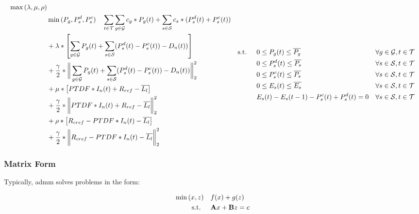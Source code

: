 \begin{subequations}
	\begin{align}
		\max{(\lambda, \mu, \rho)}\\
		 & \min{(P_g, P_s^d, P_s^c)} \quad \sum_{t\in\mathcal{T}}\sum_{g\in\mathcal{G}}c_g*P_g(t) + \sum_{s\in\mathcal{S}}c_s*(P_s^d(t)+P_s^c(t)) \nonumber \\
		 & + \lambda * \left[\sum_{g\in\mathcal{G}}P_g(t) + \sum_{s\in\mathcal{S}}(P_s^d(t)-P_s^c(t))-D_n(t))\right]\nonumber \\
		 & + \frac{\gamma}{2} * \bigg\|\sum_{g\in\mathcal{G}}P_g(t) + \sum_{s\in\mathcal{S}}(P_s^d(t)-P_s^c(t))-D_n(t))\bigg\|_2^2 \nonumber \\
		 & + \mu * \left[PTDF * I_n(t) + R_{ref} - \overline{L_l}\right] \nonumber \\
		 & + \frac{\gamma}{2} * \bigg\|PTDF * I_n(t) + R_{ref} - \overline{L_l}\bigg\|_2^2 \nonumber \\
		 & + \rho * \left[R_{cref} - PTDF * I_n(t) - \overline{L_l}\right]\nonumber \\
		 & + \frac{\gamma}{2} * \bigg\|R_{cref} - PTDF * I_n(t) - \overline{L_l}\bigg\|_2^2\nonumber
	\end{align}
	\begin{align}
		 \text{s.t. } \quad & 0 \leq P_g(t) \leq \overline{P_g} && \forall g \in \set{G}, t \in \set{T}\\\
		 & 0 \leq P_s^d(t) \leq \overline{P_s} && \forall s \in \set{S}, t \in \set{T}\\
		 & 0 \leq P_s^c(t) \leq \overline{P_s} && \forall s \in \set{S}, t \in \set{T}\\
		 & 0 \leq E_s(t) \leq \overline{E_s} && \forall s \in \set{S}, t \in \set{T}\\
		 & E_s(t) - E_s(t-1) - P_s^c(t) + P_s^d(t) = 0 && \forall s \in \set{S}, t \in \set{T}
	\end{align}
\end{subequations}

\subsubsection{Matrix Form}

Typically, \gls{admm} solves problems in the form:

\begin{subequations}
	\begin{align}
		\min{(x, z)} \quad & f(x) + g(z) \\
		\text{s.t. } \quad & \vb{A}x + \vb{B}z = c
	\end{align}
\end{subequations}

